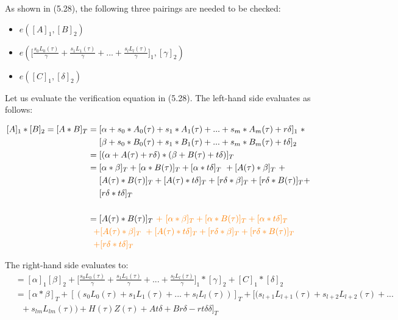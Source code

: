 As shown in (5.28), the following three pairings are needed to be checked:

\begin{itemize}
    \item \(e([A]_1, [B]_2)\)
    \item \begin{math}
        e(\bigl[\frac{s_0L_0(\tau)}{\gamma}+ \frac{s_1L_1(\tau)}{\gamma} + ... + \frac{s_lL_l(\tau)}{\gamma}\bigr]_1 , [\gamma]_2)
    \end{math}
    \item \begin{math}
        e([C]_1, [\delta]_2)
    \end{math}
\end{itemize}

Let us evaluate the verification equation in (5.28). The left-hand side evaluates as follows:

\begin{equation*}
\begin{split}
    [A]_1 * [B]_2 = [A*B]_T &= [\alpha + s_0*A_0(\tau) + s_1*A_1(\tau) + ... + s_m*A_m(\tau) + r\delta]_1 \ *\\
    &\ \ \ \ [\beta + s_0*B_0(\tau) + s_1*B_1(\tau) + ... + s_m*B_m(\tau) + t\delta]_2 \\
    &= [(\alpha + A(\tau) + r\delta) * (\beta + B(\tau) + t\delta)]_T\\
    &= [\alpha * \beta]_T + [\alpha * B(\tau)]_T + [\alpha * t\delta]_T \ + [A(\tau) * \beta]_T \ + \\
    &\ \ \ \ [A(\tau) * B(\tau)]_T + [A(\tau) * t\delta]_T + [r\delta * \beta]_T + [r\delta * B(\tau)]_T +\\
    &\ \ \ \ [r\delta * t\delta]_T \\
    \\
    &= [A(\tau) * B(\tau)]_T \textcolor{orange}{\ +\ [\alpha * \beta]_T + [\alpha * B(\tau)]_T + [\alpha * t\delta]_T} \\
    &\ \ \textcolor{orange}{+ [A(\tau) * \beta]_T \ + [A(\tau) * t\delta]_T + [r\delta * \beta]_T + [r\delta * B(\tau)]_T} \\
    &\ \ \textcolor{orange}{+ [r\delta * t\delta]_T}
\end{split}
\end{equation*}

The right-hand side evaluates to:
 \begin{equation*}
     \begin{split}
    &=[\alpha]_1[\beta]_2 + \bigl[\frac{s_0L_0(\tau)}{\gamma}+ \frac{s_1L_1(\tau)}{\gamma} + ... + \frac{s_lL_l(\tau)}{\gamma}\bigr]_1 * [\gamma]_2 + [C]_1 * [\delta]_2 \\
    &=[\alpha * \beta]_T + [(s_0L_0(\tau) + s_1L_1(\tau) + ... + s_lL_l(\tau))]_T + [(s_{l+1}L_{l+1}(\tau) + s_{l+2}L_{l+2}(\tau) + ... \\
    &\ \ \ + s_{lm}L_{lm}(\tau)) + H(\tau)Z(\tau) + At\delta + Br\delta - rt\delta\delta]_T
     \end{split}
 \end{equation*}


